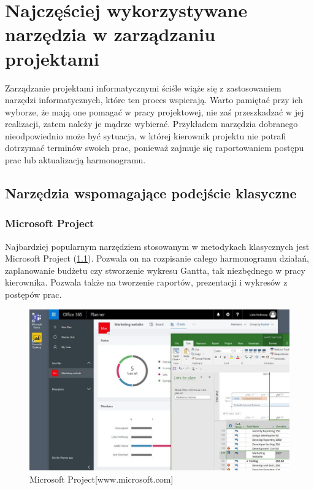 ﻿%

\chapter{Najczęściej wykorzystywane narzędzia w zarządzaniu projektami}

Zarządzanie projektami informatycznymi ściśle wiąże się z zastosowaniem narzędzi informatycznych,
które ten proces wspierają. Warto pamiętać przy ich wyborze, że mają one pomagać w pracy projektowej,
nie zaś przeszkadzać w jej realizacji, zatem należy je mądrze wybierać.
Przykładem narzędzia dobranego nieodpowiednio może być sytuacja,
w której kierownik projektu nie potrafi dotrzymać terminów swoich prac,
ponieważ zajmuje się raportowaniem postępu prac lub aktualizacją harmonogramu.
~\cite{Kopczewski_2015}

\section{Narzędzia wspomagające podejście klasyczne}

\subsection{Microsoft Project}

Najbardziej popularnym narzędziem stosowanym w metodykach klasycznych jest Microsoft Project (\ref{rys:project}).
Pozwala on na rozpisanie całego harmonogramu działań, zaplanowanie budżetu czy stworzenie wykresu Gantta,
tak niezbędnego w pracy kierownika. Pozwala także na tworzenie raportów, prezentacji i wykresów z postępów prac.

\begin{figure}[H]
	\centering\includegraphics[width=.8\textwidth]{img/Microsoft_Project.jpg}
	\caption{Microsoft Project[www.microsoft.com]}\label{rys:project}%
\end{figure}

